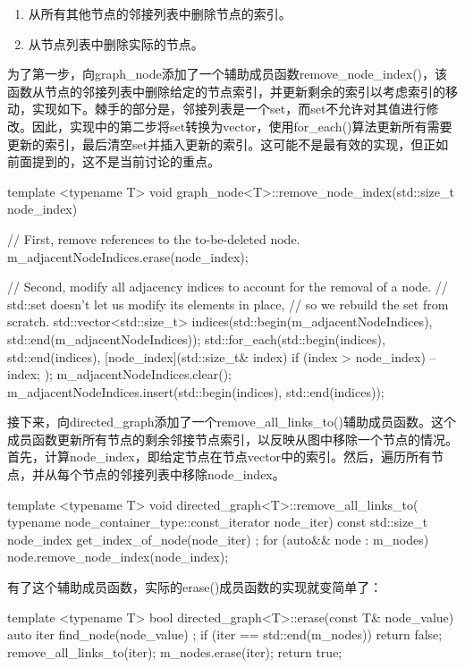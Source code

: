 \begin{enumerate}
\item
从所有其他节点的邻接列表中删除节点的索引。

\item
从节点列表中删除实际的节点。
\end{enumerate}

为了第一步，向graph\_node添加了一个辅助成员函数remove\_node\_index()，该函数从节点的邻接列表中删除给定的节点索引，并更新剩余的索引以考虑索引的移动，实现如下。棘手的部分是，邻接列表是一个set，而set不允许对其值进行修改。因此，实现中的第二步将set转换为vector，使用for\_each()算法更新所有需要更新的索引，最后清空set并插入更新的索引。这可能不是最有效的实现，但正如前面提到的，这不是当前讨论的重点。

\begin{cpp}
template <typename T>
void graph_node<T>::remove_node_index(std::size_t node_index)
{
    // First, remove references to the to-be-deleted node.
    m_adjacentNodeIndices.erase(node_index);

    // Second, modify all adjacency indices to account for the removal of a node.
    // std::set doesn't let us modify its elements in place,
    // so we rebuild the set from scratch.
    std::vector<std::size_t> indices(std::begin(m_adjacentNodeIndices),
    std::end(m_adjacentNodeIndices));
    std::for_each(std::begin(indices), std::end(indices),
        [node_index](std::size_t& index) {
            if (index > node_index) { --index; }
        });
    m_adjacentNodeIndices.clear();
    m_adjacentNodeIndices.insert(std::begin(indices), std::end(indices));
}
\end{cpp}

接下来，向directed\_graph添加了一个remove\_all\_links\_to()辅助成员函数。这个成员函数更新所有节点的剩余邻接节点索引，以反映从图中移除一个节点的情况。首先，计算node\_index，即给定节点在节点vector中的索引。然后，遍历所有节点，并从每个节点的邻接列表中移除node\_index。

\begin{cpp}
template <typename T>
void directed_graph<T>::remove_all_links_to(
    typename node_container_type::const_iterator node_iter)
{
    const std::size_t node_index { get_index_of_node(node_iter) };
    for (auto&& node : m_nodes) { node.remove_node_index(node_index); }
}
\end{cpp}

有了这个辅助成员函数，实际的erase()成员函数的实现就变简单了：

\begin{cpp}
template <typename T>
bool directed_graph<T>::erase(const T& node_value)
{
    auto iter { find_node(node_value) };
    if (iter == std::end(m_nodes)) { return false; }
    remove_all_links_to(iter);
    m_nodes.erase(iter);
    return true;
}
\end{cpp}

